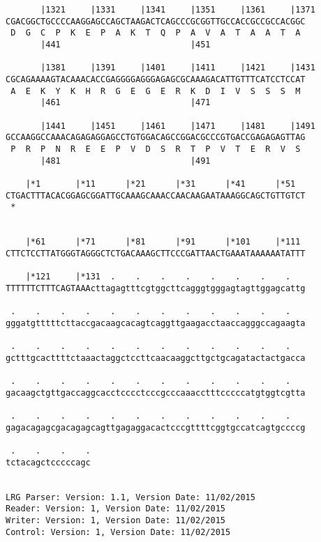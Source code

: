 \documentclass{article}
\begin{document}
\begin{Verbatim}
       |1321     |1331     |1341     |1351     |1361     |1371
CGACGGCTGCCCCAAGGAGCCAGCTAAGACTCAGCCCGCGGTTGCCACCGCCGCCACGGC
 D  G  C  P  K  E  P  A  K  T  Q  P  A  V  A  T  A  A  T  A 
       |441                          |451                   
  
       |1381     |1391     |1401     |1411     |1421     |1431
CGCAGAAAAGTACAAACACCGAGGGGAGGGAGAGCGCAAAGACATTGTTTCATCCTCCAT
 A  E  K  Y  K  H  R  G  E  G  E  R  K  D  I  V  S  S  S  M 
       |461                          |471                   
  
       |1441     |1451     |1461     |1471     |1481     |1491
GCCAAGGCCAAACAGAGAGGAGCCTGTGGACAGCCGGACGCCCGTGACCGAGAGAGTTAG
 P  R  P  N  R  E  E  P  V  D  S  R  T  P  V  T  E  R  V  S 
       |481                          |491                   
  
    |*1       |*11      |*21      |*31      |*41      |*51  
CTGACTTTACACGGAGCGGATTGCAAAGCAAACCAACAAGAATAAAGGCAGCTGTTGTCT
 *   
                                                            
  
    |*61      |*71      |*81      |*91      |*101     |*111 
CTTCTCCTTATGGGTAGGGCTCTGACAAAGCTTCCCGATTAACTGAAATAAAAAATATTT
                                                            
    |*121     |*131  .    .    .    .    .    .    .    .   
TTTTTTCTTTCAGTAAActtagagtttcgtggcttcagggtgggagtagttggagcattg
                                                            
 .    .    .    .    .    .    .    .    .    .    .    .   
gggatgtttttcttaccgacaagcacagtcaggttgaagacctaaccagggccagaagta
                                                            
 .    .    .    .    .    .    .    .    .    .    .    .   
gctttgcacttttctaaactaggctccttcaacaaggcttgctgcagatactactgacca
                                                            
 .    .    .    .    .    .    .    .    .    .    .    .   
gacaagctgttgaccaggcacctcccctcccgcccaaacctttcccccatgtggtcgtta
                                                            
 .    .    .    .    .    .    .    .    .    .    .    .   
gagacagagcgacagagcagttgagaggacactcccgttttcggtgccatcagtgccccg
                                                            
 .    .    .    .
tctacagctcccccagc
                 
                 
LRG Parser: Version: 1.1, Version Date: 11/02/2015
Reader: Version: 1, Version Date: 11/02/2015
Writer: Version: 1, Version Date: 11/02/2015
Control: Version: 1, Version Date: 11/02/2015
\end{Verbatim}
\end{document}
